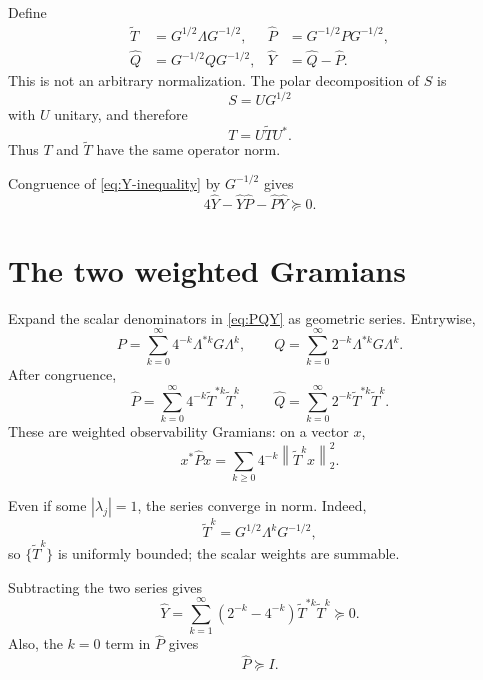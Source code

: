 \documentclass[11pt,oneside,openany]{book}
\theoremstyle{definition}
\theoremstyle{remark}
\newcommand{\norm}[1]{\left\lVert #1\right\rVert}
\begin{document}
Define
\begin{equation}
\begin{aligned}
  \widetilde T&=G^{1/2}\Lambda G^{-1/2},&
  \widehat P&=G^{-1/2}PG^{-1/2},\\
  \widehat Q&=G^{-1/2}QG^{-1/2},&
  \widehat Y&=\widehat Q-\widehat P.
\end{aligned}
\label{eq:balanced}
\end{equation}
This is not an arbitrary normalization.  The polar decomposition of
\(S\) is
\[
  S=UG^{1/2}
\]
with \(U\) unitary, and therefore
\begin{equation}
  T=U\widetilde T U^*.
  \label{eq:T-unitary-tilde}
\end{equation}
Thus \(T\) and \(\widetilde T\) have the same operator norm.

Congruence of \eqref{eq:Y-inequality} by \(G^{-1/2}\) gives
\begin{equation}
  4\widehat Y-\widehat Y\widehat P
  -\widehat P\widehat Y\succeq0.
  \label{eq:Yhat-inequality}
\end{equation}

\section{The two weighted Gramians}

Expand the scalar denominators in \eqref{eq:PQY} as geometric series.
Entrywise,
\[
  P=\sum_{k=0}^{\infty}
  4^{-k}\Lambda^{*k}G\Lambda^k,
  \qquad
  Q=\sum_{k=0}^{\infty}
  2^{-k}\Lambda^{*k}G\Lambda^k.
\]
After congruence,
\begin{equation}
  \widehat P=
  \sum_{k=0}^{\infty}
  4^{-k}\widetilde T^{*k}\widetilde T^k,
  \qquad
  \widehat Q=
  \sum_{k=0}^{\infty}
  2^{-k}\widetilde T^{*k}\widetilde T^k.
  \label{eq:two-gramians}
\end{equation}
These are weighted observability Gramians: on a vector \(x\),
\[
  x^*\widehat P x
  =\sum_{k\geq0}4^{-k}\norm{\widetilde T^kx}_2^2.
\]

Even if some \(|\lambda_j|=1\), the series converge in norm.  Indeed,
\[
  \widetilde T^k=G^{1/2}\Lambda^kG^{-1/2},
\]
so \(\{\widetilde T^k\}\) is uniformly bounded; the scalar weights are
summable.

Subtracting the two series gives
\begin{equation}
  \widehat Y=
  \sum_{k=1}^{\infty}
  (2^{-k}-4^{-k})
  \widetilde T^{*k}\widetilde T^k
  \succeq0.
  \label{eq:Yhat-positive}
\end{equation}
Also, the \(k=0\) term in \(\widehat P\) gives
\begin{equation}
  \widehat P\succeq I.
  \label{eq:Phat-lower}
\end{equation}
\end{document}
